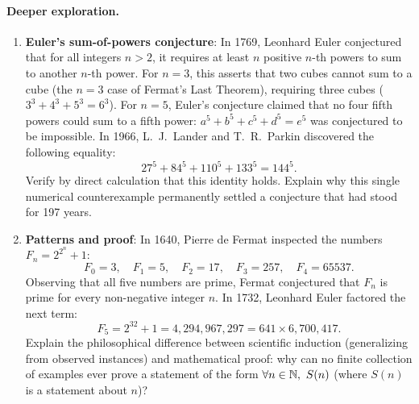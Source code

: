 \paragraph{Deeper exploration.}
\begin{enumerate}[resume]
\item \textbf{Euler's sum-of-powers conjecture}: In 1769, Leonhard Euler conjectured that for all integers $n > 2$, it requires at least $n$ positive $n$-th powers to sum to another $n$-th power. For $n = 3$, this asserts that two cubes cannot sum to a cube (the $n=3$ case of Fermat's Last Theorem), requiring three cubes ($3^3 + 4^3 + 5^3 = 6^3$). For $n = 5$, Euler's conjecture claimed that no four fifth powers could sum to a fifth power: $a^5 + b^5 + c^5 + d^5 = e^5$ was conjectured to be impossible. In 1966, L.~J.~Lander and T.~R.~Parkin discovered the following equality:
\[
27^5 + 84^5 + 110^5 + 133^5 = 144^5.
\]
Verify by direct calculation that this identity holds. Explain why this single numerical counterexample permanently settled a conjecture that had stood for 197 years.
\item \textbf{Patterns and proof}: In 1640, Pierre de Fermat inspected the numbers $F_n = 2^{2^n} + 1$:
\[
F_0 = 3, \quad F_1 = 5, \quad F_2 = 17, \quad F_3 = 257, \quad F_4 = 65537.
\]
Observing that all five numbers are prime, Fermat conjectured that $F_n$ is prime for every non-negative integer $n$. In 1732, Leonhard Euler factored the next term:
\[
F_5 = 2^{32} + 1 = 4{,}294{,}967{,}297 = 641 \times 6{,}700{,}417.
\]
Explain the philosophical difference between scientific induction (generalizing from observed instances) and mathematical proof: why can no finite collection of examples ever prove a statement of the form $\forall n \in \mathbb{N},\ S(n)$ (where $S(n)$ is a statement about $n$)?
\end{enumerate}

\newpage

